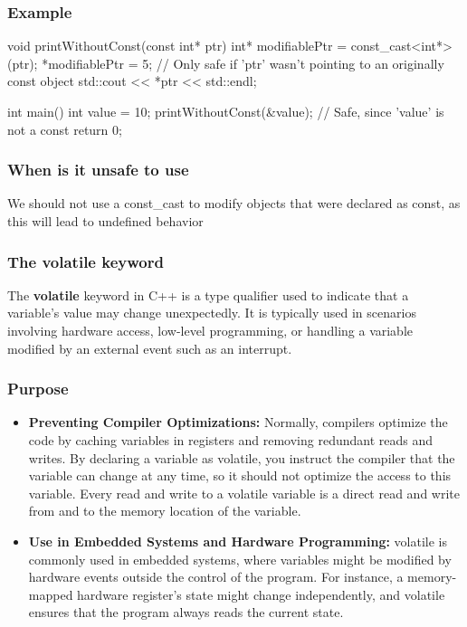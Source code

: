 \documentclass{report}
\begin{document}
\begin{concept}
    \bigbreak \noindent 
    \subsubsection{Example}
    \bigbreak \noindent 
    \begin{cppcode}
void printWithoutConst(const int* ptr) {
    int* modifiablePtr = const_cast<int*>(ptr);
    *modifiablePtr = 5; // Only safe if 'ptr' wasn't pointing to an originally const object
    std::cout << *ptr << std::endl;
}

int main() {
    int value = 10;
    printWithoutConst(&value); // Safe, since 'value' is not a const
    return 0;
}
    \end{cppcode}

    \bigbreak \noindent 
    \subsubsection{When is it unsafe to use}
    \bigbreak \noindent 
    We should not use a const\_cast to modify objects that were declared as const, as this will lead to undefined behavior

    \bigbreak \noindent 
    \subsubsection{The volatile keyword}
    \bigbreak \noindent 
    \begin{concept}
        The \textbf{volatile} keyword in C++ is a type qualifier used to indicate that a variable's value may change unexpectedly. It is typically used in scenarios involving hardware access, low-level programming, or handling a variable modified by an external event such as an interrupt.
    \end{concept}
    \bigbreak \noindent 
    \subsubsection{Purpose}
    \begin{itemize}
        \item \textbf{Preventing Compiler Optimizations:} Normally, compilers optimize the code by caching variables in registers and removing redundant reads and writes. By declaring a variable as volatile, you instruct the compiler that the variable can change at any time, so it should not optimize the access to this variable. Every read and write to a volatile variable is a direct read and write from and to the memory location of the variable.
        \item \textbf{Use in Embedded Systems and Hardware Programming:} volatile is commonly used in embedded systems, where variables might be modified by hardware events outside the control of the program. For instance, a memory-mapped hardware register's state might change independently, and volatile ensures that the program always reads the current state.
    \end{itemize}
    


\end{concept}
\end{document}

